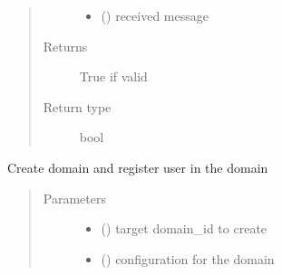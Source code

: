 \documentclass[letterpaper,10pt,english]{sphinxmanual}
\begin{document}
\begin{fulllineitems}
\begin{fulllineitems}
\begin{quote}
\begin{description}
\begin{itemize}
\item {} 
 () \textendash{} received message

\end{itemize}

\item[{Returns}] \leavevmode
True if valid

\item[{Return type}] \leavevmode
bool

\end{description}\end{quote}

\end{fulllineitems}


\begin{fulllineitems}
\label{\detokenize{bbc1.core.bbc_network:bbc1.core.bbc_network.BBcNetwork.create_domain}}
Create domain and register user in the domain
\begin{quote}\begin{description}
\item[{Parameters}] \leavevmode\begin{itemize}
\item {} 
 () \textendash{} target domain\_id to create

\item {} 
 () \textendash{} configuration for the domain

\end{itemize}


\end{description}
\end{quote}
\end{fulllineitems}
\end{fulllineitems}
\end{document}
